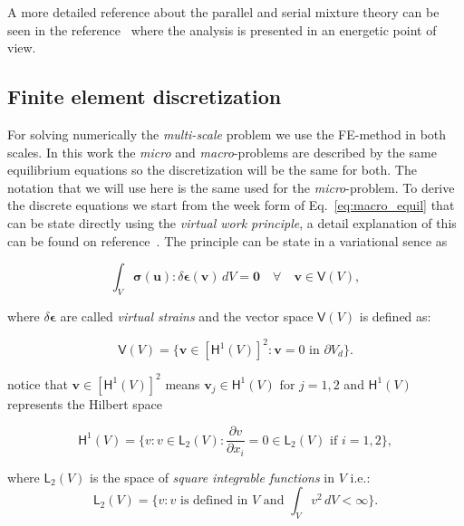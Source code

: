 \documentclass[review]{elsarticle}
\begin{document}
A more detailed reference about the parallel and serial mixture theory can be seen in the
reference~\cite{oller-composites} where the analysis is presented in an
energetic point of view.


\subsection{Finite element discretization}

For solving numerically the \emph{multi-scale} problem we use the
FE-method in both scales.
In this work the \emph{micro} and \emph{macro}-problems 
are described by the same equilibrium equations so the discretization will
be the same for both. The notation that we will use here is the same used for
the \emph{micro}-problem.
To derive the discrete equations we start from the week form
of Eq.~\ref{eq:macro_equil} that can be state directly using the \emph{virtual work
principle}, a detail explanation of this can be found on reference~\cite{bathe-virt-work}.
The principle can be state in a variational sence as

\begin{equation}
\int_V \bm{\sigma}(\bm{u}) : \delta \bm{\epsilon}(\bm{v})
\, dV = \bm{0} \quad \forall \quad \bm{v} \in \bm{\mathsf{V}}(V),
\end{equation}

\noindent
where $\delta \bm{\epsilon}$ are called \emph{virtual strains} and the vector
space $\bm{\mathsf{V}}(V)$ is defined as:

\begin{equation}
\bm{\mathsf{V}}(V) =
\{ 
  \bm{v} \in \left[\bm{\mathsf{H}}^1(V)\right]^2: \bm{v}=0 \text{ in } \partial V_d
\}.
\end{equation}

\noindent
notice that $\bm{v} \in \left[\bm{\mathsf{H}}^1(V)\right]^2$ means 
$\bm{v}_j \in \bm{\mathsf{H}}^1(V) \text{ for } j=1,2$ and $\bm{\mathsf{H}}^1(V) $ 
represents the Hilbert space

\begin{equation}
\bm{\mathsf{H}}^1(V) = \{ 
  v : v \in \bm{\mathsf{L}}_2(V): \frac{\partial v}{\partial x_i}=0 \in \bm{\mathsf{L}}_2(V)
  \text{ if } i=1,2 
\},
\end{equation}

\noindent
where $\bm{\mathsf{L}}_2(V)$ is the space of \emph{square integrable functions} in $V$
i.e.:
\begin{equation}
\bm{\mathsf{L}}_2(V) = \{ 
  v : v \text{ is defined in } V \text{ and } \int_V v^2 \, dV < \infty
\}.
\end{equation}
\end{document}

